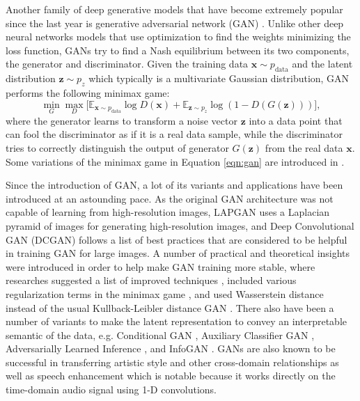 Another family of deep generative models that have become extremely popular since the last year is generative adversarial network (GAN) \cite{goodfellow2014gan}.
Unlike other deep neural networks models that use optimization to find the weights minimizing the loss function, GANs try to find a Nash equilibrium between its two components, the generator and discriminator.
Given the training data $\mathbf{x}\sim p_{\mathrm{data}}$ and the latent distribution $\mathbf{z} \sim p_z$ which typically is a multivariate Gaussian distribution, GAN performs the following minimax game:
\begin{equation}\label{eqn:gan}
	\min_{G} \max_{D} \Big[ \mathbb{E}_{\mathbf{x} \sim p_{\mathrm{data}}} {\log D(\mathbf{x})} + \mathbb{E}_{\mathbf{z} \sim p_z} \log \left ( 1 - D(G(\mathbf{z})) \right ) \Big],
\end{equation}
where the generator learns to transform a noise vector $\mathbf{z}$ into a data point that can fool the discriminator as if it is a real data sample, while the discriminator tries to correctly distinguish the output of generator $G(\mathbf{z})$ from the real data $\mathbf{x}$.
Some variations of the minimax game in Equation \ref{eqn:gan} are introduced in \cite{goodfellow2016gan}.

Since the introduction of GAN, a lot of its variants and applications have been introduced at an astounding pace.
As the original GAN architecture was not capable of learning from high-resolution images, LAPGAN \cite{denton2015lapgan} uses a Laplacian pyramid of images for generating high-resolution images, and Deep Convolutional GAN (DCGAN) \cite{radford2015dcgan} follows a list of best practices that are considered to be helpful in training GAN for large images.
A number of practical and theoretical insights were introduced in order to help make GAN training more stable, where researches suggested a list of improved techniques \cite{salimans2016improved}, included various regularization terms in the minimax game \cite{che2016mrgan}, and used Wasserstein distance instead of the usual Kullback-Leibler distance GAN \cite{arjovsky2017wasserstein,berthelot2017began}.
There also have been a number of variants to make the latent representation to convey an interpretable semantic of the data, e.g. Conditional GAN \cite{mirza2014conditional}, Auxiliary Classifier GAN \cite{odena2016acgan}, Adversarially Learned Inference \cite{dumoulin2016ali}, and InfoGAN \cite{chen2016infogan}.
GANs are also known to be successful in transferring artistic style \cite{zhu2017unpaired} and other cross-domain relationships \cite{kim2017discogan} as well as speech enhancement \cite{pascual2017segan} which is notable because it works directly on the time-domain audio signal using 1-D convolutions.

